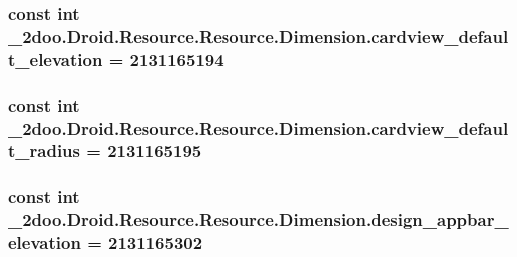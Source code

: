 \hypertarget{class__2doo_1_1_droid_1_1_resource_1_1_dimension_a5b36f11266e50aba9d3c58bb16f9115}{
\subsubsection[{cardview\_\-default\_\-elevation}]{\setlength{\rightskip}{0pt plus 5cm}const int \_\-2doo.Droid.Resource.Resource.Dimension.cardview\_\-default\_\-elevation = 2131165194}}
\label{class__2doo_1_1_droid_1_1_resource_1_1_dimension_a5b36f11266e50aba9d3c58bb16f9115}


\hypertarget{class__2doo_1_1_droid_1_1_resource_1_1_dimension_f8ecf8752e155135de47172572a6975c}{
\subsubsection[{cardview\_\-default\_\-radius}]{\setlength{\rightskip}{0pt plus 5cm}const int \_\-2doo.Droid.Resource.Resource.Dimension.cardview\_\-default\_\-radius = 2131165195}}
\label{class__2doo_1_1_droid_1_1_resource_1_1_dimension_f8ecf8752e155135de47172572a6975c}


\hypertarget{class__2doo_1_1_droid_1_1_resource_1_1_dimension_3cf56f111a6aa4e9e4672f9c48645011}{
\subsubsection[{design\_\-appbar\_\-elevation}]{\setlength{\rightskip}{0pt plus 5cm}const int \_\-2doo.Droid.Resource.Resource.Dimension.design\_\-appbar\_\-elevation = 2131165302}}
\label{class__2doo_1_1_droid_1_1_resource_1_1_dimension_3cf56f111a6aa4e9e4672f9c48645011}


